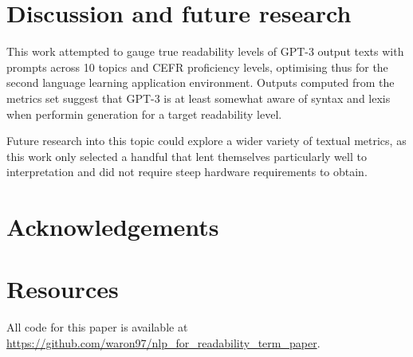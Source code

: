 \documentclass[11pt]{article}
\begin{document}
\section{Discussion and future research}

This work attempted to gauge true readability levels of GPT-3 output texts with prompts across 10 topics and CEFR proficiency levels, optimising thus for the second language learning application environment. Outputs computed from the metrics set suggest that GPT-3 is at least somewhat aware of syntax and lexis when performin generation for a target readability level.

Future research into this topic could explore a wider variety of textual metrics, as this work only selected a handful that lent themselves particularly well to interpretation and did not require steep hardware requirements to obtain.

\section*{Acknowledgements}




\appendix
\section*{Resources}

\label{sec:appendix}

All code for this paper is available at \url{https://github.com/waron97/nlp_for_readability_term_paper}.
\end{document}
